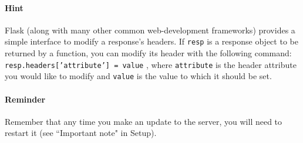 \paragraph{Hint} Flask (along with many other common web-development
frameworks) provides a simple interface to modify a response's headers.
If \texttt{resp} is a response object to be returned by a function, you
can modify its header with the following command:
\\\texttt{resp.headers['attribute'] = value} , where \texttt{attribute}
is the header attribute you would like to modify and \texttt{value} is
the value to which it should be set. 

\paragraph{Reminder} Remember that any time you make an update to the
server, you will need to restart it (see ``Important note" in Setup).




